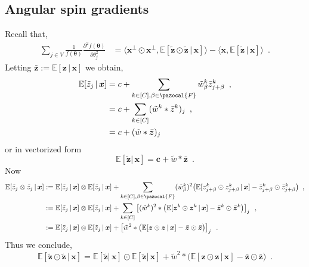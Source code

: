 \documentclass[12pt]{article}
\theoremstyle{definition}%
\theoremstyle{definition}
\theoremstyle{remark}
\begin{document}
\subsection{Angular spin gradients}
Recall that,
\begin{align}
\sum_{j\in V}\frac{1}{f(\bm{\theta})}\frac{\partial^2 f(\bm{\theta})}{\partial \theta_j^2} 
	& = \big\langle \bm{x}^\perp \odot \bm{x}^\perp, \mathbb{E}[ \tilde{\bm{z}} \odot \tilde{\bm{z}} \, | \, \bm{x} ] \big\rangle - \big\langle \bm{x}, \mathbb{E}[\tilde{\bm{z}} \, | \, \bm{x} ]\big\rangle \enspace .
\end{align}
Letting $\bar{\bm{z}} := \mathbb{E}[\bm{z} \, | \, \bm{x}]$ we obtain,
\begin{align}
	\mathbb{E}[\tilde{z}_j \, | \, \bm{x}] 
		& = c + \sum_{k\in[C], \beta \in \pazocal{F}} \tilde{w}_\beta^k \bar{z}_{j+\beta}^k \enspace , \\
		& = c + \sum_{k\in[C]} (\tilde{w}^k \ast \bar{z}^k)_j \enspace , \\
		& = c + (\tilde{w} \ast \bar{\bm{z}})_j
\end{align}
or in vectorized form
\begin{equation}
	\mathbb{E}[\tilde{\bm{z}} | \, \bm{x}] = \bm{c} + \tilde{w} \ast \bar{\bm{z}} \enspace .
\end{equation}
Now
\begin{align}
	\mathbb{E}[\tilde{z}_j \otimes \tilde{z}_j \, | \, \bm{x}]
		& := \mathbb{E}[\tilde{z}_j \, | \, \bm{x}] \otimes \mathbb{E}[\tilde{z}_j \, | \, \bm{x}] + \sum_{k\in[C], \beta \in \pazocal{F}} (\tilde{w}_\beta^k)^2 \big(\mathbb{E}[z_{j+\beta}^k \odot z_{j+\beta}^k \, | \, \bm{x}] - \bar{z}_{j+\beta}^k \odot \bar{z}_{j+\beta}^k\big) \enspace , \\
		& := \mathbb{E}[\tilde{z}_j \, | \, \bm{x}] \otimes \mathbb{E}[\tilde{z}_j \, | \, \bm{x}] + \sum_{k\in[C]} \left[(\tilde{w}^k)^2 \ast \big(\mathbb{E}[\bm{z}^k \odot \bm{z}^k \, | \, \bm{x}] - \bar{\bm{z}}^k \odot \bar{\bm{z}}^k\big)\right]_j \enspace , \\
		& := \mathbb{E}[\tilde{z}_j \, | \, \bm{x}] \otimes \mathbb{E}[\tilde{z}_j \, | \, \bm{x}] + \left[\tilde{w}^2 \ast \big(\mathbb{E}[\bm{z} \odot \bm{z} \, | \, \bm{x}] - \bar{\bm{z}} \odot \bar{\bm{z}}\big)\right]_j \enspace .
\end{align}
Thus we conclude,
\begin{equation}
	\mathbb{E}[\tilde{\bm{z}} \odot \tilde{\bm{z}} \, | \, \bm{x}] = \mathbb{E}[\tilde{\bm{z}} | \, \bm{x}] \odot \mathbb{E}[\tilde{\bm{z}} | \, \bm{x}] + \tilde{w}^2 \ast \big(\mathbb{E}[\bm{z} \odot \bm{z} \, | \, \bm{x}] - \bar{\bm{z}} \odot \bar{\bm{z}}\big) \enspace .
\end{equation}
\end{document}
